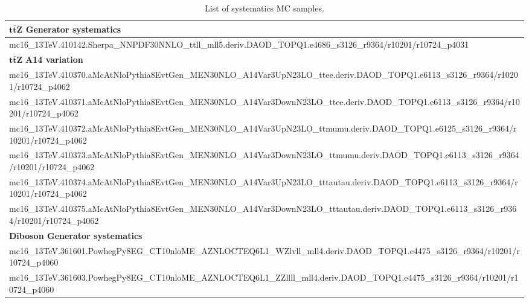 \begin{table}[htbp]
	\notsotiny
	\caption{
		List of systematics MC samples.
	}%
	\label{tab:mc_bkg_sys}
	\centering
	\begin{adjustwidth}{-1.1cm}{}
	\begin{tabular}{l}
		\toprule
		$\mathbf{t\bar{t}Z}$ \textbf{Generator systematics} \\
		\hline
		mc16\_13TeV.410142.Sherpa\_NNPDF30NNLO\_ttll\_mll5.deriv.DAOD\_TOPQ1.e4686\_s3126\_r9364/r10201/r10724\_p4031\\
		\hline
		$\mathbf{t\bar{t}Z}$ \textbf{A14 variation} \\
		\hline
		mc16\_13TeV.410370.aMcAtNloPythia8EvtGen\_MEN30NLO\_A14Var3UpN23LO\_ttee.deriv.DAOD\_TOPQ1.e6113\_s3126\_r9364/r10201/r10724\_p4062 \\
		mc16\_13TeV.410371.aMcAtNloPythia8EvtGen\_MEN30NLO\_A14Var3DownN23LO\_ttee.deriv.DAOD\_TOPQ1.e6113\_s3126\_r9364/r10201/r10724\_p4062 \\
		mc16\_13TeV.410372.aMcAtNloPythia8EvtGen\_MEN30NLO\_A14Var3UpN23LO\_ttmumu.deriv.DAOD\_TOPQ1.e6125\_s3126\_r9364/r10201/r10724\_p4062 \\
		mc16\_13TeV.410373.aMcAtNloPythia8EvtGen\_MEN30NLO\_A14Var3DownN23LO\_ttmumu.deriv.DAOD\_TOPQ1.e6113\_s3126\_r9364/r10201/r10724\_p4062 \\
		mc16\_13TeV.410374.aMcAtNloPythia8EvtGen\_MEN30NLO\_A14Var3UpN23LO\_tttautau.deriv.DAOD\_TOPQ1.e6113\_s3126\_r9364/r10201/r10724\_p4062 \\
		mc16\_13TeV.410375.aMcAtNloPythia8EvtGen\_MEN30NLO\_A14Var3DownN23LO\_tttautau.deriv.DAOD\_TOPQ1.e6113\_s3126\_r9364/r10201/r10724\_p4062 \\
		\hline
		\textbf{Diboson Generator systematics} \\
		\hline
		mc16\_13TeV.361601.PowhegPy8EG\_CT10nloME\_AZNLOCTEQ6L1\_WZlvll\_mll4.deriv.DAOD\_TOPQ1.e4475\_s3126\_r9364/r10201/r10724\_p4060 \\
		mc16\_13TeV.361603.PowhegPy8EG\_CT10nloME\_AZNLOCTEQ6L1\_ZZllll\_mll4.deriv.DAOD\_TOPQ1.e4475\_s3126\_r9364/r10201/r10724\_p4060 \\

\end{tabular}
\end{adjustwidth}
\end{table}

